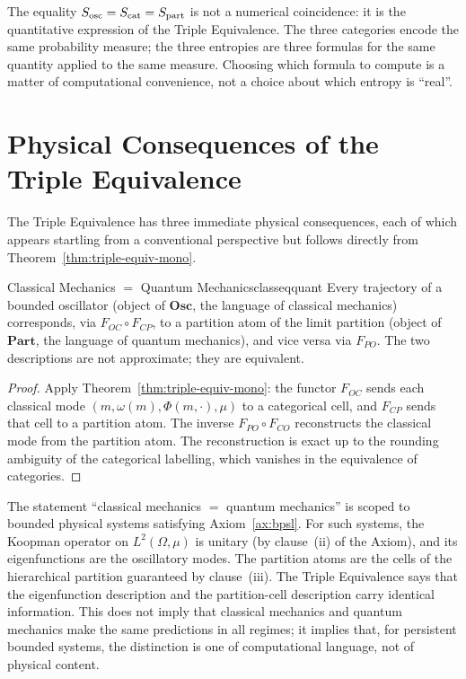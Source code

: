 \begin{remark}
The equality $S_{\mathrm{osc}} = S_{\mathrm{cat}} = S_{\mathrm{part}}$ is not a numerical coincidence: it is the
quantitative expression of the Triple Equivalence.  The three categories encode
the same probability measure; the three entropies are three formulas for the
same quantity applied to the same measure.  Choosing which formula to compute
is a matter of computational convenience, not a choice about which entropy is
``real''.
\end{remark}

\section{Physical Consequences of the Triple Equivalence}
\label{sec:ch15-consequences}

The Triple Equivalence has three immediate physical consequences, each of
which appears startling from a conventional perspective but follows directly
from Theorem~\ref{thm:triple-equiv-mono}.

\begin{consequence}{Classical Mechanics $=$ Quantum Mechanics}{classeqquant}
Every trajectory of a bounded oscillator (object of $\mathbf{Osc}$, the
language of classical mechanics) corresponds, via $F_{OC} \circ F_{CP}$, to
a partition atom of the limit partition (object of $\mathbf{Part}$, the
language of quantum mechanics), and vice versa via $F_{PO}$.  The two
descriptions are not approximate; they are equivalent.
\end{consequence}

\begin{proof}
Apply Theorem~\ref{thm:triple-equiv-mono}: the functor $F_{OC}$ sends each
classical mode $(m, \omega(m), \Phi(m,\cdot), \mu)$ to a categorical cell, and
$F_{CP}$ sends that cell to a partition atom.  The inverse $F_{PO} \circ F_{CO}$
reconstructs the classical mode from the partition atom.  The reconstruction
is exact up to the rounding ambiguity of the categorical labelling, which
vanishes in the equivalence of categories.
\end{proof}

\begin{remark}
The statement ``classical mechanics $=$ quantum mechanics'' is scoped
to bounded physical systems satisfying Axiom~\ref{ax:bpsl}.  For such
systems, the Koopman operator on $L^2(\Omega, \mu)$ is unitary (by
clause~(ii) of the Axiom), and its eigenfunctions are the oscillatory modes.
The partition atoms are the cells of the hierarchical partition guaranteed by
clause~(iii).  The Triple Equivalence says that the eigenfunction description
and the partition-cell description carry identical information.  This does not
imply that classical mechanics and quantum mechanics make the same predictions
in all regimes; it implies that, for persistent bounded systems, the distinction
is one of computational language, not of physical content.
\end{remark}

